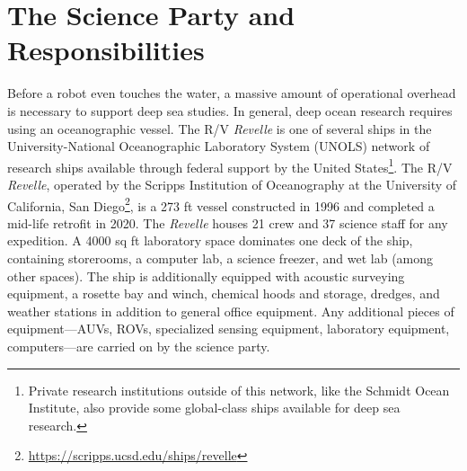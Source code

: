 \section{The Science Party and Responsibilities}
Before a robot even touches the water, a massive amount of operational overhead is necessary to support deep sea studies. In general, deep ocean research requires using an oceanographic vessel. The R/V \emph{Revelle} is one of several ships in the University-National Oceanographic Laboratory System (UNOLS) network of research ships available through federal support by the United States\footnote{Private research institutions outside of this network, like the Schmidt Ocean Institute, also provide some global-class ships available for deep sea research.}. The R/V \emph{Revelle}, operated by the Scripps Institution of Oceanography at the University of California, San Diego\footnote{\url{https://scripps.ucsd.edu/ships/revelle}}, is a 273 ft vessel constructed in 1996 and completed a mid-life retrofit in 2020. The \emph{Revelle} houses 21 crew and 37 science staff for any expedition. A 4000 sq ft laboratory space dominates one deck of the ship, containing storerooms, a computer lab, a science freezer, and wet lab (among other spaces). The ship is additionally equipped with acoustic surveying equipment, a rosette bay and winch, chemical hoods and storage, dredges, and weather stations in addition to general office equipment. Any additional pieces of equipment---AUVs, ROVs, specialized sensing equipment, laboratory equipment, computers---are carried on by the science party.

